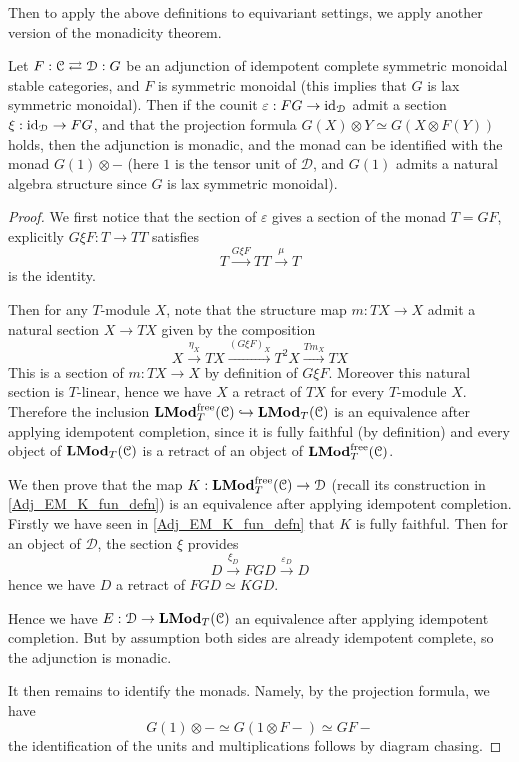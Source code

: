 	Then to apply the above definitions to equivariant settings, we apply another version of the monadicity theorem. 

	\begin{thm}\label{Beck_monadicity_tensor_cat}
		Let $F:\mathcal{C}\rightleftarrows\mathcal{D}:G$ be an adjunction of idempotent complete symmetric monoidal stable categories, and $F$ is symmetric monoidal (this implies that $G$ is lax symmetric monoidal). Then if the counit $\varepsilon:FG\to\operatorname{\mathrm{id}}_\mathcal{D}$ admit a section $\xi:\operatorname{\mathrm{id}}_\mathcal{D}\to FG$, and that the projection formula $G(X)\otimes Y\simeq G(X\otimes F(Y))$ holds, then the adjunction is monadic, and the monad can be identified with the monad $G(1)\otimes-$ (here $1$ is the tensor unit of $\mathcal{D}$, and $G(1)$ admits a natural algebra structure since $G$ is lax symmetric monoidal). 
	\end{thm}
	\begin{proof}
		We first notice that the section of $\varepsilon$ gives a section of the monad $T=GF$, explicitly $G\xi F:T\to TT$ satisfies 
		\[ T\xrightarrow{G\xi F}TT\xrightarrow{\mu}T \]
		is the identity. 

		Then for any $T$-module $X$, note that the structure map $m:TX\to X$ admit a natural section $X\to TX$ given by the composition 
		\[ X\xrightarrow{\eta_X}TX\xrightarrow{(G\xi F)_X}T^2X\xrightarrow{Tm_X}TX \]
		This is a section of $m:TX\to X$ by definition of $G\xi F$. Moreover this natural section is $T$-linear, hence we have $X$ a retract of $TX$ for every $T$-module $X$. Therefore the inclusion $\mathbf{LMod}_T^{\mathrm{free}}(\mathcal{C})\hookrightarrow\mathbf{LMod}_T(\mathcal{C})$ is an equivalence after applying idempotent completion, since it is fully faithful (by definition) and every object of $\mathbf{LMod}_T(\mathcal{C})$ is a retract of an object of $\mathbf{LMod}_T^{\mathrm{free}}(\mathcal{C})$. 

		We then prove that the map $K:\mathbf{LMod}_T^{\mathrm{free}}(\mathcal{C})\to\mathcal{D}$ (recall its construction in \cref{Adj_EM_K_fun_defn}) is an equivalence after applying idempotent completion. Firstly we have seen in \cref{Adj_EM_K_fun_defn} that $K$ is fully faithful. Then for an object of $\mathcal{D}$, the section $\xi$ provides 
		\[ D\xrightarrow{\xi_D}FGD\xrightarrow{\varepsilon_D}D \]
		hence we have $D$ a retract of $FGD\simeq KGD$. 

		Hence we have $E:\mathcal{D}\to\mathbf{LMod}_T(\mathcal{C})$ an equivalence after applying idempotent completion. But by assumption both sides are already idempotent complete, so the adjunction is monadic. 

		It then remains to identify the monads. Namely, by the projection formula, we have 
		\[ G(1)\otimes-\simeq G(1\otimes F-)\simeq GF- \]
		the identification of the units and multiplications follows by diagram chasing. 
	\end{proof}

